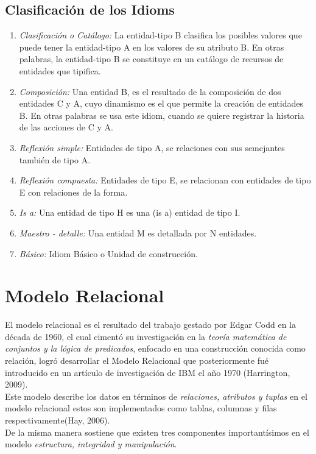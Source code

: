 \subsection{Clasificación de los Idioms}
\begin{enumerate}
    \item \textit {Clasificación o Catálogo:} La entidad-tipo B clasifica los posibles valores
    que puede tener la entidad-tipo A en los valores de su atributo
    B. En otras palabras, la entidad-tipo B se constituye en un
    catálogo de recursos de entidades que tipifica.
    \item \textit {Composición:} Una entidad B, es el resultado de la composición
    de dos entidades C y A, cuyo dinamismo es el que permite la
    creación de entidades B. En otras palabras se usa este idiom,
    cuando se quiere registrar la historia de las acciones de C y A.
    \item \textit {Reflexión simple:} Entidades de tipo A, se relaciones con sus
    semejantes también de tipo A.
    \item \textit {Reflexión compuesta:} Entidades de tipo E, se relacionan con
    entidades de tipo E con relaciones de la forma.
    \item \textit {Is a:} Una entidad de tipo H es una (is a) entidad
    de tipo I.
    \item \textit {Maestro - detalle:} Una entidad M es detallada por N entidades.
    \item \textit {Básico:} Idiom Básico o Unidad de construcción.
\end{enumerate}
\section {Modelo Relacional}
\noindent El modelo relacional es el resultado del trabajo gestado por Edgar Codd en la década de 1960,
\noindent el cual cimentó su investigación en la \textit {teoría matemática de conjuntos y la lógica de predicados}, enfocado en una construcción
\noindent conocida como relación, logró desarrollar el Modelo Relacional que posteriormente fué introducido en un artículo
\noindent de investigación de IBM el año 1970 (Harrington, 2009).\\
\noindent Este modelo describe los datos en términos de \textit{relaciones, atributos y tuplas}
\noindent en el modelo relacional estos son implementados como tablas, columnas y filas respectivamente(Hay, 2006).\\
\noindent De la misma manera sostiene que existen tres componentes importantísimos en el modelo \textit {estructura, integridad y manipulación}.
